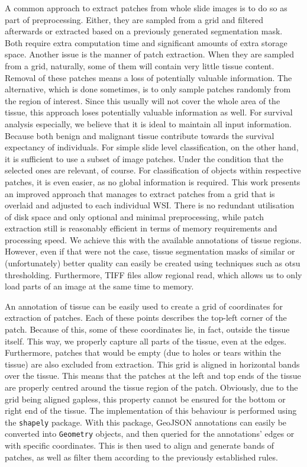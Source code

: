 A common approach to extract patches from whole slide images is to do so as part of preprocessing. Either, they are sampled from a grid and filtered afterwards \cite{Ren2018Recurrence, Cheerla2019Deep}  or extracted  based on a previously generated segmentation mask. \cite{Chen2021Whole, Chen2021Whole, Lu2021Data, Iizuka2020Deep}
Both require extra computation time and significant amounts of extra storage space. Another issue is the manner of patch extraction. When they are sampled from a grid, naturally, some of them will contain very little tissue content. Removal of these patches means a loss of potentially valuable information. The alternative, which is done sometimes, is to only sample patches randomly from the region of interest. Since this usually will not cover the whole area of the tissue, this approach loses potentially valuable information as well.
For survival analysis especially, we believe that it is ideal to maintain all input information. Because both benign and malignant tissue contribute towards the survival expectancy of individuals. For simple slide level classification, on the other hand, it is sufficient to use a subset of image patches. Under the condition that the selected ones are relevant, of course. For classification of objects within respective patches, it is even easier, as no global information is required.
This work presents an improved approach that manages to extract patches from a grid that is overlaid and adjusted to each individual WSI. There is no redundant utilisation of disk space and only optional and minimal preprocessing, while patch extraction still is reasonably efficient in terms of memory requirements and processing speed. We achieve this with the available annotations of tissue regions. However, even if that were not the case, tissue segmentation masks of similar or (unfortunately) better quality can easily be created using techniques such as otsu thresholding. \cite{Otsu1979Threshold} Furthermore, TIFF files allow regional read, which allows us to only load parts of an image at the same time to memory.

An annotation of tissue can be easily used to create a grid of coordinates for extraction of patches. Each of these points describes the top-left corner of the patch. Because of this, some of these coordinates lie, in fact, outside the tissue itself. This way, we properly capture all parts of the tissue, even at the edges. Furthermore, patches that would be empty (due to holes or tears within the tissue) are also excluded from extraction. This grid is aligned in horizontal bands over the tissue. This means that the patches at the left and top ends of the tissue are properly centred around the tissue region of the patch. Obviously, due to the grid being aligned gapless, this property cannot be ensured for the bottom or right end of the tissue. 
The implementation of this behaviour is performed using the \verb|shapely| package. With this package, GeoJSON annotations can easily be converted into \verb|Geometry| objects, and then queried for the annotations' edges or with specific coordinates. This is then used to align and generate bands of patches, as well as filter them according to the previously established rules. 

